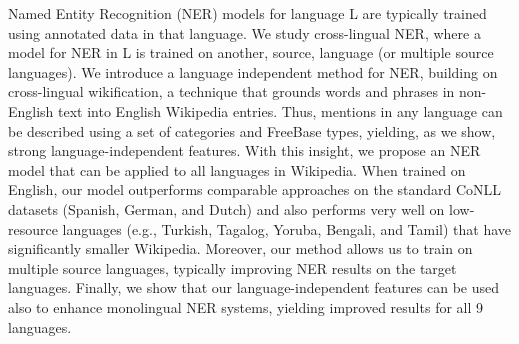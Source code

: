 Named Entity Recognition (NER) models for language L are typically trained using annotated data in that language. We study cross-lingual NER, where a model for NER in L is trained on another, source, language (or multiple source languages). We introduce a language independent method for NER, building on cross-lingual wikification, a technique that grounds words and phrases in non-English text into English Wikipedia entries. Thus, mentions in any language can be described using a set of categories and FreeBase types, yielding, as we show, strong language-independent features. With this insight, we propose an NER model that can be applied to all languages in Wikipedia.                        When trained on English, our model outperforms comparable approaches on the standard CoNLL datasets (Spanish, German, and Dutch) and also performs very well on low-resource languages (e.g., Turkish, Tagalog, Yoruba, Bengali, and Tamil) that have significantly smaller Wikipedia. Moreover, our method allows us to train on multiple source languages, typically  improving NER results on the target languages. Finally, we show that our language-independent features can be used also to enhance monolingual NER systems, yielding improved results for all 9 languages.

